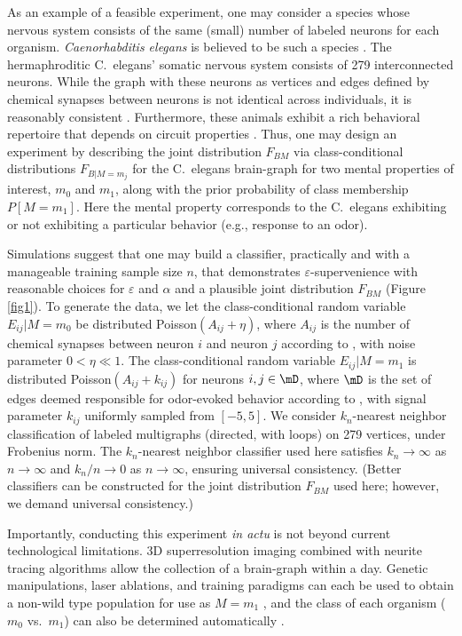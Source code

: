 As an example of a feasible experiment, one may consider a species whose nervous system consists of the same (small) number of labeled neurons for each organism. {\it Caenorhabditis elegans} is believed to be such a species \cite{Durbin87}. The hermaphroditic C.~elegans' somatic nervous system consists of 279 interconnected neurons. While the graph with these neurons as vertices and edges defined by chemical synapses between neurons is not identical across individuals, it is reasonably consistent \cite{Durbin87}. Furthermore, these animals exhibit a rich behavioral repertoire that depends on circuit properties \cite{deBonoMaricq05}. Thus, one may design an experiment by describing the joint distribution $F_{BM}$ via class-conditional distributions $F_{B|M=m_j}$ for the C.~elegans brain-graph for two mental properties of interest, $m_0$ and $m_1$, along with the prior probability of class membership $P[M=m_1]$. Here the mental property corresponds to the C.~elegans exhibiting or not exhibiting a particular behavior (e.g., response to an odor).

Simulations suggest that one may build a classifier, practically and with a manageable training sample size $n$, that demonstrates $\varepsilon$-supervenience with reasonable choices for $\varepsilon$ and $\alpha$ and a plausible joint distribution $F_{BM}$ (Figure \ref{fig1}). To generate the data, we let the class-conditional random variable $E_{ij} | M=m_0$ be distributed Poisson$(A_{ij}+\eta)$, where $A_{ij}$ is the number of chemical synapses between neuron $i$ and neuron $j$ according to \cite{VarshneyChklovskii09}, with noise parameter $0<\eta \ll 1$. The class-conditional random variable $E_{ij} | M=m_1$ is distributed Poisson$(A_{ij}+ k_{ij})$ for neurons $i,j \in \mD$, where $\mD$ is the set of edges deemed responsible for odor-evoked behavior according to \cite{ChalasaniBargmann07}, with signal parameter $k_{ij}$ uniformly sampled from $[-5,5]$. We consider $k_n$-nearest neighbor classification of labeled multigraphs (directed, with loops) on 279 vertices, under Frobenius norm. The $k_n$-nearest neighbor classifier used here satisfies $k_n \rightarrow \infty$ as $n \rightarrow \infty$ and $k_n/n \rightarrow 0$ as $n \rightarrow \infty$, ensuring universal consistency. (Better classifiers can be constructed for the joint distribution $F_{BM}$ used here; however, we demand universal consistency.)

Importantly, conducting this experiment {\it in actu} is not beyond current technological limitations. 3D superresolution imaging \cite{VaziriShank08} combined with neurite tracing algorithms \cite{HelmstaedterDenk08,Mishchenko09,LuLichtman09} allow the collection of a brain-graph within a day. Genetic manipulations, laser ablations, and training paradigms can each be used to obtain a non-wild type population for use as $M=m_1$ \cite{deBonoMaricq05}, and the class of each organism ($m_0$ vs.~$m_1$) can also be determined automatically \cite{BuckinghamSattelle08}.

